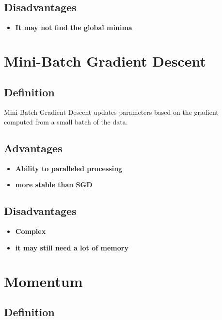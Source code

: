 \documentclass{article}
\begin{document}
\subsection{Disadvantages}

\begin{itemize}
    \item \textbf{It may not find the global minima}
    
\end{itemize}

\newpage

\section{Mini-Batch Gradient Descent}

\subsection{Definition}

Mini-Batch Gradient Descent updates parameters based on the gradient computed from a small batch of the data.

\subsection{Advantages}

\begin{itemize}
    \item \textbf{Ability to paralleled processing }
    \item \textbf{more stable than SGD}
\end{itemize}

\subsection{Disadvantages}

\begin{itemize}
    \item \textbf{Complex}
    \item \textbf{it may still need a lot of memory}
\end{itemize}

\section{Momentum}

\subsection{Definition}
\end{document}
